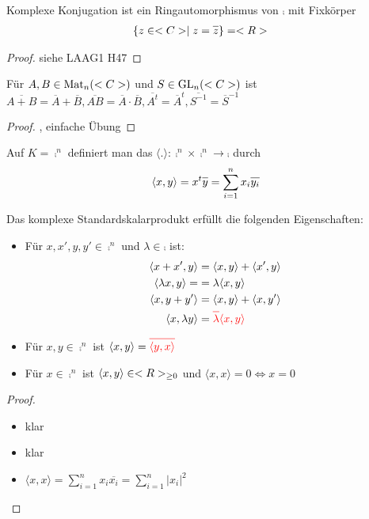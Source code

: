 \begin{proposition}
	Komplexe Konjugation ist ein Ringautomorphismus von $\comp$ mit Fixkörper
	\begin{align}
		\{z\in\comp\mid z=\overline{z}\}&=\real\notag
	\end{align}
\end{proposition}
\begin{proof}
	siehe LAAG1 H47
\end{proof}

\begin{conclusion}
	Für $A,B\in\operatorname{Mat}_n(<C>)$ und $S\in\operatorname{GL}_n(<C>)$ ist $\overline{A+B}=\overline{A}+\overline{B}, \overline{AB}=\overline{A}\cdot \overline{B},\overline{A^t}=\overline{A}^t, \overline{S^{-1}}=\overline{S}^{-1}$
\end{conclusion}
\begin{proof}
	, einfache Übung
\end{proof}

\begin{definition}
	Auf $K=\comp^n$ definiert man das  $\langle.\rangle:\comp^n\times\comp^n\to \comp$ durch
	\begin{align}
	\langle x,y\rangle=x^t\overline{y}=\sum_{i=1}^n x_i\overline{y_i}\notag
	\end{align}
\end{definition}

\begin{proposition}
	Das komplexe Standardskalarprodukt erfüllt die folgenden Eigenschaften:
	\begin{itemize}
		\item Für $x,x',y,y'\in\comp^n$ und $\lambda\in\comp$ ist:
		\begin{align}
		\langle x+x',y\rangle &= \langle x,y\rangle + \langle x',y\rangle\notag\\
		\langle \lambda x,y\rangle =&= \lambda \langle x,y \rangle\notag \\
		\langle x,y+y' \rangle &= \langle x,y \rangle + \langle x,y'\rangle\notag \\
		\langle x,\lambda y \rangle &= \color{red}{\overline{\lambda}} \langle x,y \rangle\notag
		\end{align}
		\item Für $x,y\in\comp^n$ ist $\langle x,y \rangle=\color{red}\overline{\langle y,x\rangle}$
		\item Für $x\in\comp^n$ ist $\langle x,y \rangle\in<R>_{\ge 0}$ und $\langle x,x\rangle=0\iff x=0$
	\end{itemize}
\end{proposition}
\begin{proof}
	\begin{itemize}
		\item klar
		\item klar
		\item $\langle x,x\rangle=\sum_{i=1}^n x_i\overline{x_i}=\sum_{i=1}^n \vert x_i\vert^2$
	\end{itemize}
\end{proof}

